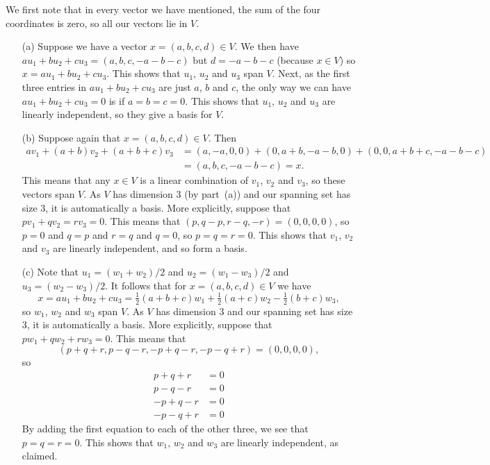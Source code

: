 \documentclass{amsart}
\newcommand{\half}      {{\tfrac{1}{2}}}
\renewcommand{\:}{\colon}
\theoremstyle{definition}
\newenvironment{solution}{{\noindent \bf Solution:}}{}
\begin{document}
\begin{solution}
 We first note that in every vector we have mentioned, the sum of
 the four coordinates is zero, so all our vectors lie in $V$.
 \begin{itemize}
  \item[(a)] Suppose we have a vector $x=(a,b,c,d)\in V$.  We then
  have $au_1+bu_2+cu_3=(a,b,c,-a-b-c)$ but $d=-a-b-c$ (because
  $x\in V$) so $x=au_1+bu_2+cu_3$.  This shows that $u_1$, $u_2$
  and $u_3$ span $V$.  Next, as the first three entries in
  $au_1+bu_2+cu_3$ are just $a$, $b$ and $c$, the only way we can
  have $au_1+bu_2+cu_3=0$ is if $a=b=c=0$.  This shows that $u_1$,
  $u_2$ and $u_3$ are linearly independent, so they give a basis
  for $V$.
  \item[(b)] Suppose again that $x=(a,b,c,d)\in V$.  Then
   \begin{align*}
    a v_1 + (a+b) v_2 + (a+b+c) v_3 &=
      (a,-a,0,0) + (0,a+b,-a-b,0) + (0,0,a+b+c,-a-b-c) \\
      &= (a,b,c,-a-b-c) = x.
   \end{align*}
   This means that any $x\in V$ is a linear combination of $v_1$,
   $v_2$ and $v_3$, so these vectors span $V$.  As $V$ has
   dimension $3$ (by part~(a)) and our spanning set has size $3$,
   it is automatically a basis. More explicitly, suppose that
   $pv_1+qv_2=rv_3=0$.  This means that
   $(p,q-p,r-q,-r)=(0,0,0,0)$, so $p=0$ and $q=p$ and $r=q$ and
   $q=0$, so $p=q=r=0$.  This shows that $v_1$, $v_2$ and $v_3$
   are linearly independent, and so form a basis.
  \item[(c)] Note that $u_1=(w_1+w_2)/2$ and $u_2=(w_1-w_3)/2$ and
  $u_3=(w_2-w_3)/2$.  It follows that for $x=(a,b,c,d)\in V$ we
  have
   \[ x = au_1+bu_2+cu_3 =
       \half(a+b+c)w_1 + \half(a+c)w_2 - \half(b+c)w_3,
   \]
   so $w_1$, $w_2$ and $w_3$ span $V$.  As $V$ has dimension $3$
   and our spanning set has size $3$, it is automatically a basis.
   More explicitly, suppose that $pw_1+qw_2+rw_3=0$.  This means
   that
   \[ (p+q+r,p-q-r,-p+q-r,-p-q+r)=(0,0,0,0), \]
   so
   \begin{align*}
     p+q+r &= 0 \\
     p-q-r &= 0 \\
    -p+q-r &= 0 \\
    -p-q+r &= 0
   \end{align*}
   By adding the first equation to each of the other three, we see
   that $p=q=r=0$.  This shows that $w_1$, $w_2$ and $w_3$ are
   linearly independent, as claimed.
 \end{itemize}
\end{solution}
\end{document}
